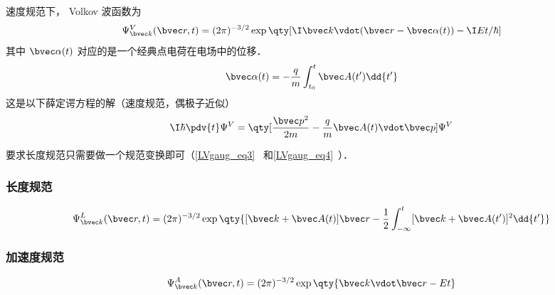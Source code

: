 
\begin{issues}
\issueDraft
\issueMissDepend
\end{issues}

速度规范下， Volkov 波函数为
 \begin{equation}
\Psi_{\bvec k}^V(\bvec r, t) = (2\pi)^{-3/2} \exp\qty[\I \bvec k \vdot (\bvec r - \bvec \alpha(t)) - \I Et/\hbar]
\end{equation}
其中 $\bvec \alpha(t)$ 对应的是一个经典点电荷在电场中的位移．
\begin{equation}
\bvec \alpha(t) = -\frac{q}{m} \int_{t_0}^t \bvec A(t') \dd{t'}
\end{equation}
这是以下薛定谔方程的解（速度规范，偶极子近似）
\begin{equation}
\I\hbar \pdv{t} \Psi^V = \qty[\frac{\bvec p^2}{2m} - \frac{q}{m}\bvec A(t) \vdot \bvec p] \Psi^V
\end{equation}

要求长度规范只需要做一个规范变换即可（\autoref{LVgaug_eq3}~ 和\autoref{LVgaug_eq4}~）．

\subsubsection{长度规范}
\begin{equation}
\Psi_{\bvec k}^L(\bvec r, t) = (2\pi)^{-3/2} \exp\qty{[\bvec k + \bvec A(t)]\bvec r - \frac{1}{2}\int_{-\infty}^t [\bvec k + \bvec A(t')]^2 \dd{t'}}
\end{equation}

\subsubsection{加速度规范}
\begin{equation}
\Psi_{\bvec k}^A(\bvec r, t) = (2\pi)^{-3/2} \exp\qty{\bvec k \vdot \bvec r - Et}
\end{equation}
